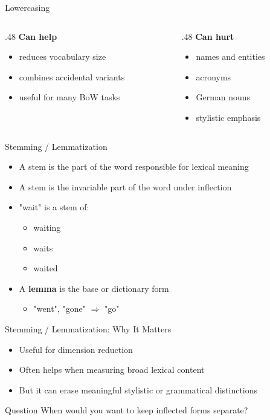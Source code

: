 \documentclass[11pt,aspectratio=43]{beamer}
\begin{document}
\begin{frame}{Lowercasing}
\begin{columns}[T]
\begin{column}{.48\textwidth}
\textbf{Can help}
\begin{itemize}
\item reduces vocabulary size
\item combines accidental variants
\item useful for many BoW tasks
\end{itemize}
\end{column}
\begin{column}{.48\textwidth}
\textbf{Can hurt}
\begin{itemize}
\item names and entities
\item acronyms
\item German nouns
\item stylistic emphasis
\end{itemize}
\end{column}
\end{columns}
\end{frame}

\begin{frame}{Stemming / Lemmatization}
\begin{itemize}
\item A stem is the part of the word responsible for lexical meaning
\item A stem is the invariable part of the word under inflection
\item "wait" is a stem of:
  \begin{itemize}\item waiting\item waits\item waited\end{itemize}
\item A \textbf{lemma} is the base or dictionary form
  \begin{itemize}\item "went", "gone" $\Rightarrow$ "go"\end{itemize}
\end{itemize}
\end{frame}

\begin{frame}{Stemming / Lemmatization: Why It Matters}
\begin{itemize}
\item Useful for dimension reduction
\item Often helps when measuring broad lexical content
\item But it can erase meaningful stylistic or grammatical distinctions
\end{itemize}
\vspace{.7em}
\begin{block}{Question}
When would you want to keep inflected forms separate?
\end{block}
\end{frame}
\end{document}
